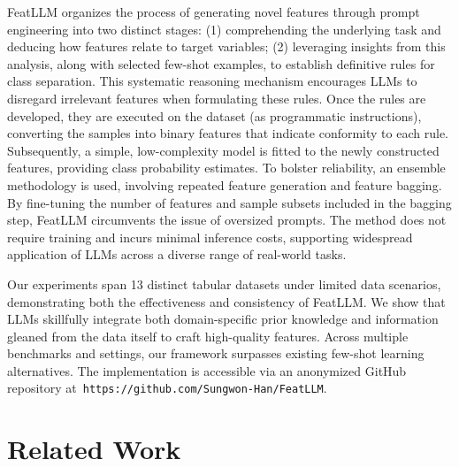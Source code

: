 \textsf{FeatLLM} organizes the process of generating novel features through prompt engineering into two distinct stages: (1) comprehending the underlying task and deducing how features relate to target variables; (2) leveraging insights from this analysis, along with selected few-shot examples, to establish definitive rules for class separation. This systematic reasoning mechanism encourages LLMs to disregard irrelevant features when formulating these rules. Once the rules are developed, they are executed on the dataset (as programmatic instructions), converting the samples into binary features that indicate conformity to each rule. Subsequently, a simple, low-complexity model is fitted to the newly constructed features, providing class probability estimates. To bolster reliability, an ensemble methodology is used, involving repeated feature generation and feature bagging. By fine-tuning the number of features and sample subsets included in the bagging step, \textsf{FeatLLM} circumvents the issue of oversized prompts. The method does not require training and incurs minimal inference costs, supporting widespread application of LLMs across a diverse range of real-world tasks.

Our experiments span 13 distinct tabular datasets under limited data scenarios, demonstrating both the effectiveness and consistency of \textsf{FeatLLM}. We show that LLMs skillfully integrate both domain-specific prior knowledge and information gleaned from the data itself to craft high-quality features. Across multiple benchmarks and settings, our framework surpasses existing few-shot learning alternatives. The implementation is accessible via an anonymized GitHub repository at~\texttt{https://github.com/Sungwon-Han/FeatLLM}.

\section{Related Work}

